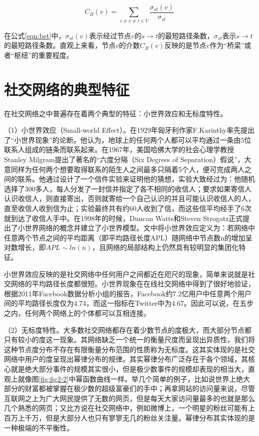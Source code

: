 \begin{equation}
  \label{eqn:bet}
  C_B(v)=\sum _{s\neq v\neq t \in V}\frac{\sigma_{st}(v)}{\sigma_{st}}
\end{equation}

在公式\ref{eqn:bet}中，$\sigma_{st}(v)$表示经过节点$v$的$s\rightarrow t$的最短路径条数，$\sigma_{st}$表示$s\rightarrow t$的最短路径条数。直观上来看，节点$v$的介数$C_B(v)$反映的是节点$v$作为“桥梁”或者“枢纽”的重要程度。

\section{社交网络的典型特征}

在社交网络之中普遍存在着两个典型的特征：小世界效应和无标度特性。

（1）小世界效应（Small-world Effect）。在1929年匈牙利作家F.Karinthy率先提出了“小世界现象”的论断。他认为，地球上的任何两个人都可以平均通过一条由5位联系人组成的链条而联系起来。在1967年，美国哈佛大学的社会心理学教授Stanley Milgram提出了著名的“六度分隔（Six Degrees of Separation）假说”，大意同样为任何两个想要取得联系的陌生人之间最多只隔着5个人，便可完成两人之间的联系。他通过设计了一个信件实验来证明他的猜想，实验大致经过为：他随机选择了300多人，每人分发了一封信并指定了各不相同的收信人；要求如果寄信人认识收信人，则直接寄出，否则就寄给一个自己认识的并且可能认识收信人的人，直至收信人收到信为止；实验最终共有约60人收到了信，而这些信平均经手了6次就到达了收信人手中。在1998年的时候，Duncan Watts和Steven Strogatz正式提出了小世界网络的概念并建立了小世界模型\cite{Watts1998Collectivedynamics}。文中将小世界效应定义为：若网络中任意两个节点之间的平均距离（即平均路径长度APL）随网络中节点数n的增加呈对数增长，即$APL\sim ln(n)$，且网络的局部结构上仍然具有较明显的集团化特征。

小世界效应反映的是社交网络中任何用户之间都近在咫尺的现象，简单来说就是社交网络的平均路径长度都很短。小世界现象在在线社交网络中得到了很好地验证，根据2011年Facebook数据分析小组的报告，Facebook约7.2亿用户中任意两个用户间的平均路径长度仅为4.74，而这一指标在Twitter中为4.67。因此可以说，在五步之内，任何两个网络上的个体都可以互相连接。

（2）无标度特性。大多数社交网络都存在着少数节点的度极大，而大部分节点都只有较小的度这一现象。其网络缺乏一个统一的衡量尺度而呈现出异质性，我们将这种节点度分布不存在有限衡量分布范围的性质称为无标度。这其实体现的是社交网络中用户的度呈现出幂律分布的规律。其实幂律分布广泛存在于各个领域，其核心就是绝大部分事件的规模其实很小，但是极少数事件的规模却表现的相当大，直观上就像图\ref{fig:fig2-2}中幂函数曲线一样。举几个简单的例子，比如说世界上绝大部分的财富都被掌握在极少数的超级富豪们的手中；再拿网站的访问量来说，尽管互联网之上为广大网民提供了无数的网页，但是每天大家访问量最多的也就是那么几个熟悉的网页；又比方说在社交网络中，例如微博上，一个明星的粉丝可能有上百万上千万，但是大部分人也只有寥寥无几的粉丝关注量。幂律分布其实体现的是一种极端的不平衡性。

